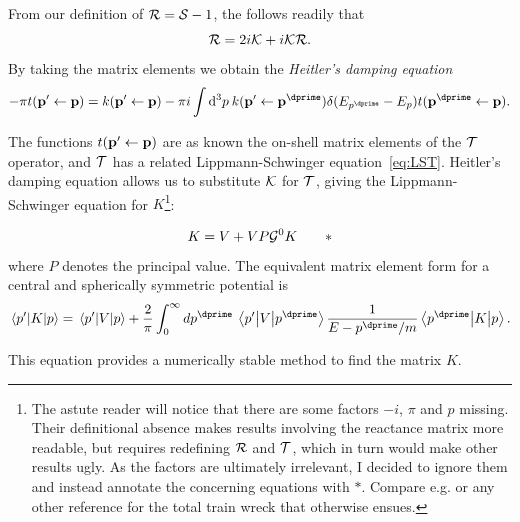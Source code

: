 From our definition of \(\mathcal{R}=\mathcal{S}-1\), the follows readily that
\begin{equation*}
  \mathcal{R} = 2i\mathcal{K} + i\mathcal{K}\mathcal{R}.
\end{equation*}
By taking the matrix elements we obtain the \textit{Heitler's damping equation}
\begin{equation*}
  -\pi t(\vb{p}^{\prime}\leftarrow\vb{p}) = k(\vb{p}^{\prime}\leftarrow\vb{p}) - \pi i
  \int \dd^{3}p\: k(\vb{p}^{\prime}\leftarrow\vb{p}^{\dprime}) \delta(E_{p^{\dprime}}-E_{p})t(\vb{p}^{\dprime}\leftarrow\vb{p}).
\end{equation*}

The functions \(t(\vb{p}^{\prime}\leftarrow\vb{p}) \) are as known the on-shell
matrix elements of the \(\mathcal{T}\) operator, and \(\mathcal{T}\) has a related
Lippmann-Schwinger equation~\eqref{eq:LST}. Heitler's damping equation allows us
to substitute \(\mathcal{K}\) for \(\mathcal{T}\), giving the Lippmann-Schwinger
equation for \(K\)\footnote{The astute reader will notice that there are some
  factors \(-i\), \(\pi\) and \(p\) missing. Their definitional absence makes results
  involving the reactance matrix more readable, but requires redefining
  \(\mathcal{R}\) and \(\mathcal{T}\), which in turn would make other results ugly. As the
  factors are ultimately irrelevant, I decided to ignore them and instead
  annotate the concerning equations with \(*\). Compare e.g.
  \cite{taylor,morten,reactance} or any other reference for the total train wreck
  that
  otherwise ensues.}:

\begin{equation*}
  K = V + VP\mathcal{G}^{0}K
  \tag*{$*$}
\end{equation*}
where \(P\) denotes the principal value. The equivalent matrix element form for
a central and spherically symmetric potential is\cite{morten}
\begin{equation}
  \label{eq:LSK}
  \mel{p^{\prime}}{K}{p} = \mel{p^{\prime}}{V}{p} + \frac{2}{\pi}\int_{0}^{\infty}dp^{\dprime}\:
  \mel{p^{\prime}}{V}{p^{\dprime}}\frac{1}{E-p^{\dprime}/m} \mel{p^{\dprime}}{K}{p} .
\end{equation}

This equation provides a numerically stable method to find the matrix \(K\).

